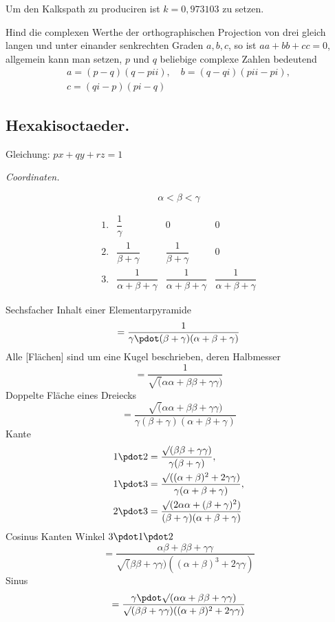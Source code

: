 Um den Kalkspath zu produciren ist $k=0{,}973103$ zu setzen.

Hind die complexen Werthe der orthographischen Projection von drei gleich langen und unter einander senkrechten Graden $a,b,c$, so ist $aa+bb+cc=0$, allgemein kann man setzen, $p$ und $q$ beliebige complexe Zahlen bedeutend
\[
\begin{gathered}
a=(p-q)(q-pii),\quad b=(q-qi)(pii-pi),\\c=(qi-p)(pi-q)
\end{gathered}
\]

\subsection*{Hexakisoctaeder.}
\begin{center}
\resizebox{!}{14mm}{}\qquad Gleichung: $px+qy+rz=1$
\end{center}

\begin{center}\emph{Coordinaten.}\end{center}
\begin{center}
\begin{minipage}{.28\textwidth}\centering
\resizebox{\linewidth}{!}{}
\[\alpha<\beta<\gamma\]
\end{minipage}\hfill
\begin{minipage}{.68\textwidth}
\[
\begin{array}{rccc}
1.&\dfrac1\gamma&0&0\\[1ex]
2.&\dfrac1{\beta+\gamma}&\dfrac1{\beta+\gamma}&0\\[1ex]
3.&\dfrac1{\alpha+\beta+\gamma}&\dfrac1{\alpha+\beta+\gamma}&\dfrac1{\alpha+\beta+\gamma}
\end{array}
\]
\end{minipage}
\end{center}

Sechsfacher Inhalt einer Elementarpyramide
\[
=\frac1{\gamma\pdot(\beta+\gamma)(\alpha+\beta+\gamma)}
\]
Alle [Flächen] sind um eine Kugel beschrieben, deren Halbmesser
\[
=\frac1{\surd(\alpha\alpha+\beta\beta+\gamma\gamma)}
\]
Doppelte Fläche eines Dreiecks
\[
=\frac{\surd(\alpha\alpha+\beta\beta+\gamma\gamma)}{\gamma(\beta+\gamma)(\alpha+\beta+\gamma)}
\]
Kante
\[
\begin{aligned}
1\pdot2&=\frac{\surd(\beta\beta+\gamma\gamma)}{\gamma(\beta+\gamma)},\\
1\pdot3&=\frac{\surd((\alpha+\beta)^2+2\gamma\gamma)}{\gamma(\alpha+\beta+\gamma)},\\
2\pdot3&=\frac{\surd(2\alpha\alpha+(\beta+\gamma)^2)}{(\beta+\gamma)(\alpha+\beta+\gamma)}
\end{aligned}
\]
Cosinus Kanten Winkel $3\pdot1\pdot2$
\[
=\frac{\alpha\beta+\beta\beta+\gamma\gamma}{\surd(\beta\beta+\gamma\gamma)((\alpha+\beta)^3+2\gamma\gamma)}
\]
Sinus
\[
=\frac{\gamma\pdot\surd(\alpha\alpha+\beta\beta+\gamma\gamma)}{\surd(\beta\beta+\gamma\gamma)((\alpha+\beta)^2+2\gamma\gamma)}
\]

